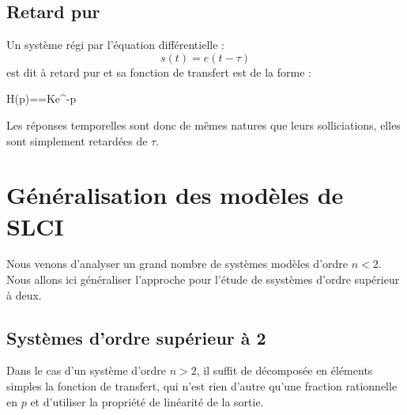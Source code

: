 \subsection{Retard pur}
Un système régi par l'équation différentielle :
\[
s(t)=e(t-\tau)
\]
est dit à retard pur et sa fonction de transfert est de la forme :
\begin{bequation}
    H(p)==Ke^{-\tau p}
\end{bequation}
Les réponses temporelles sont donc de mêmes natures que 
leurs solliciations, elles sont simplement retardées de $\tau$.
\section{Généralisation des modèles de SLCI}
Nous venons d'analyser un grand nombre de systèmes modèles d'ordre $n<2$. 
Nous allons ici généraliser l'approche pour l'étude de ssystèmes d'ordre 
supérieur à deux.
\subsection{Systèmes d'ordre supérieur à 2}
Dans le cas d'un système d'ordre $n>2$, il suffit de décomposée en éléments 
simples la fonction de transfert, qui n'est rien d'autre qu'une fraction 
rationnelle en $p$ et d'utiliser la propriété de linéarité de la sortie.

